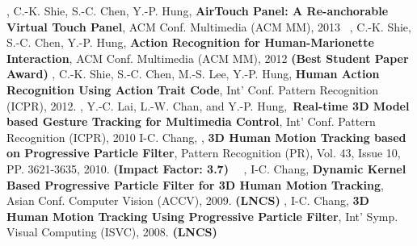     \pubitem \mikelin, C.-K. Shie, S.-C. Chen, Y.-P. Hung, \textbf{AirTouch Panel: A Re-anchorable Virtual Touch Panel}, ACM Conf. Multimedia (ACM MM), 2013~\href{https://www.csie.ntu.edu.tw/~d00944001/videos/AirTouch\%20Panel.mp4}{\faFilm}
    \pubitem \mikelin, C.-K. Shie, S.-C. Chen, Y.-P. Hung, \textbf{Action Recognition for Human-Marionette Interaction}, ACM Conf. Multimedia (ACM MM), 2012 {\textbf {\color{red}(Best Student Paper Award)}}
    \pubitem \mikelin, C.-K. Shie, S.-C. Chen, M.-S. Lee, Y.-P. Hung, \textbf{Human Action Recognition Using Action Trait Code}, Int' Conf. Pattern Recognition (ICPR), 2012.
    \pubitem \mikelin, Y.-C. Lai, L.-W. Chan, and Y.-P. Hung,~\textbf{Real-time 3D Model based Gesture Tracking for Multimedia Control}, Int' Conf. Pattern Recognition (ICPR), 2010
    \pubitem I-C. Chang, \mikelin, \textbf{3D Human Motion Tracking based on Progressive Particle Filter}, Pattern Recognition (PR), Vol. 43, Issue 10, PP. 3621-3635, 2010. \textbf{(Impact Factor: 3.7)}~\href{https://www.csie.ntu.edu.tw/~d00944001/videos/Lin_PR_2010.pdf}{\faFileTextO}~\href{https://www.csie.ntu.edu.tw/~d00944001/videos/Pattern\%20Recognition-\%203D\%20human\%20motion\%20tracking\%20based\%20on\%20a\%20progressive\%20particle\%20filter\%20(Shih-Yao\%20Lin).mp4}{\faFilm}
    \pubitem \mikelin, I-C. Chang, \textbf{Dynamic Kernel Based Progressive Particle Filter for 3D Human Motion Tracking},  Asian Conf. Computer Vision (ACCV), 2009. \textbf{(LNCS)}
    \pubitem \mikelin, I-C. Chang, \textbf{3D Human Motion Tracking Using Progressive Particle Filter}, Int' Symp. Visual Computing (ISVC), 2008. \textbf{(LNCS)}
\PubItemEnd

